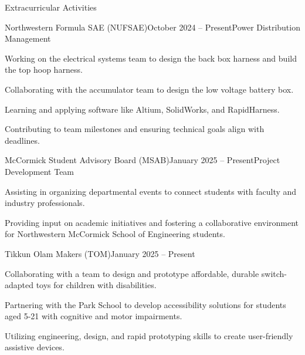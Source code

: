 \documentclass[
	a4paper, %
	9pt, %
]{resume} %
\begin{document}

\begin{rSection}{Extracurricular Activities}

    \begin{rSubsection}{Northwestern Formula SAE (NUFSAE)}{October 2024 -- Present}{Power Distribution Management}{}{}
    	\item Working on the electrical systems team to design the back box harness and build the top hoop harness.
    	\item Collaborating with the accumulator team to design the low voltage battery box.
        	\item Learning and applying software like Altium, SolidWorks, and RapidHarness.
        	\item Contributing to team milestones and ensuring technical goals align with deadlines.
    \end{rSubsection}

    \begin{rSubsection}{McCormick Student Advisory Board (MSAB)}{January 2025 -- Present}{Project Development Team}{}{}
        	\item Assisting in organizing departmental events to connect students with faculty and industry professionals.
        	\item Providing input on academic initiatives and fostering a collaborative environment for Northwestern McCormick School of Engineering  students.
    \end{rSubsection}

    \begin{rSubsection}{Tikkun Olam Makers (TOM)}{January 2025 -- Present}{}{}
    	\item Collaborating with a team to design and prototype affordable, durable switch-adapted toys for children with disabilities.
    	\item Partnering with the Park School to develop accessibility solutions for students aged 5-21 with cognitive and motor impairments.
    	\item Utilizing engineering, design, and rapid prototyping skills to create user-friendly assistive devices.
    \end{rSubsection}


\end{rSection}
\end{document}
